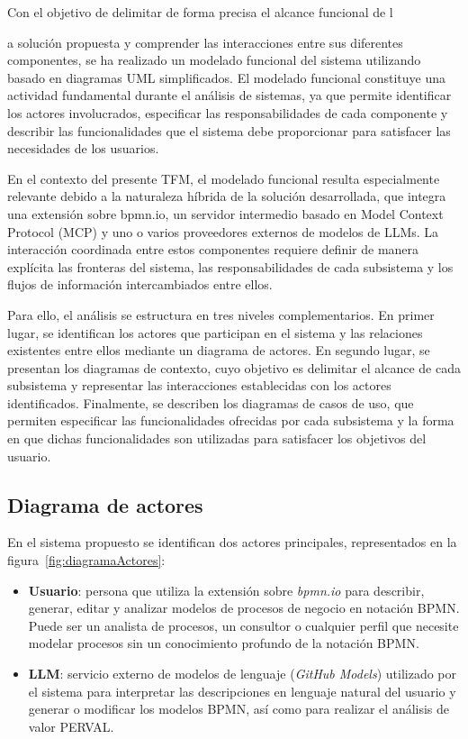 Con el objetivo de delimitar de forma precisa el alcance funcional de l{a solución propuesta y comprender las interacciones entre sus diferentes componentes, se ha realizado un modelado funcional del sistema utilizando basado en diagramas UML simplificados. El modelado funcional constituye una actividad fundamental durante el análisis de sistemas, ya que permite identificar los actores involucrados, especificar las responsabilidades de cada componente y describir las funcionalidades que el sistema debe proporcionar para satisfacer las necesidades de los usuarios.

En el contexto del presente TFM, el modelado funcional resulta especialmente relevante debido a la naturaleza híbrida de la solución desarrollada, que integra una extensión sobre bpmn.io, un servidor intermedio basado en Model Context Protocol (MCP) y uno o varios proveedores externos de modelos de LLMs. La interacción coordinada entre estos componentes requiere definir de manera explícita las fronteras del sistema, las responsabilidades de cada subsistema y los flujos de información intercambiados entre ellos.

Para ello, el análisis se estructura en tres niveles complementarios. En primer lugar, se identifican los actores que participan en el sistema y las relaciones existentes entre ellos mediante un diagrama de actores. En segundo lugar, se presentan los diagramas de contexto, cuyo objetivo es delimitar el alcance de cada subsistema y representar las interacciones establecidas con los actores identificados. Finalmente, se describen los diagramas de casos de uso, que permiten especificar las funcionalidades ofrecidas por cada subsistema y la forma en que dichas funcionalidades son utilizadas para satisfacer los objetivos del usuario.

\subsection{Diagrama de actores}
\label{subsec:diagramaActores}

En el sistema propuesto se identifican dos actores principales, representados en la figura~\ref{fig:diagramaActores}:

\begin{itemize}
    \item \textbf{Usuario}: persona que utiliza la extensión sobre \textit{bpmn.io} para describir, generar, editar y analizar modelos de procesos de negocio en notación BPMN. Puede ser un analista de procesos, un consultor o cualquier perfil que necesite modelar procesos sin un conocimiento profundo de la notación BPMN.
    \item \textbf{LLM}: servicio externo de modelos de lenguaje (\textit{GitHub Models}) utilizado por el sistema para interpretar las descripciones en lenguaje natural del usuario y generar o modificar los modelos BPMN, así como para realizar el análisis de valor PERVAL.
\end{itemize}

}
